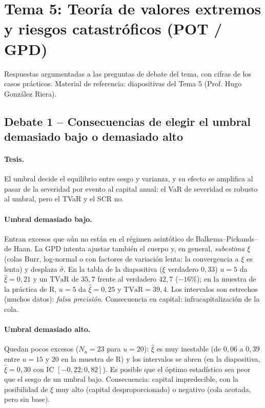 \documentclass[a4paper,12pt]{article}
\newcommand{\TVaR}{\mathrm{TVaR}}
\begin{document}
\restoregeometry
\newpage
{}
\setcounter{page}{1}

\section{Tema 5: Teoría de valores extremos y riesgos catastróficos (POT / GPD)}
\label{sec:tema5debate}
\noindent
Respuestas argumentadas a las preguntas de debate del tema, con cifras de los casos prácticos. Material de referencia: diapositivas del Tema 5 (Prof. Hugo González Riera).

\subsection{Debate 1 -- Consecuencias de elegir el umbral demasiado bajo o demasiado alto}

\paragraph{Tesis.} El umbral decide el equilibrio entre sesgo y varianza, y su efecto se amplifica al pasar de la severidad por evento al capital anual: el VaR de severidad es robusto al umbral, pero el TVaR y el SCR no.

\paragraph{Umbral demasiado bajo.} Entran excesos que a\'un no est\'an en el r\'egimen asint\'otico de Balkema--Pickands--de Haan. La GPD intenta ajustar tambi\'en el cuerpo y, en general, \emph{subestima} $\xi$ (colas Burr, log-normal o con factores de variaci\'on lenta: la convergencia a $\xi$ es lenta) y desplaza $\hat\sigma$. En la tabla de la diapositiva ($\xi$ verdadero $0{,}33$) $u=5$ da $\hat\xi=0{,}21$ y un $\TVaR$ de $35{,}7$ frente al verdadero $42{,}7$ ($-16\%$); en la muestra de la pr\'actica de R, $u=5$ da $\hat\xi=0{,}25$ y $\TVaR=39{,}4$. Los intervalos son estrechos (muchos datos): \emph{falsa precisi\'on}. Consecuencia en capital: infracapitalizaci\'on de la cola.

\paragraph{Umbral demasiado alto.} Quedan pocos excesos ($N_u=23$ para $u=20$): $\hat\xi$ es muy inestable (de $0{,}06$ a $0{,}39$ entre $u=15$ y $20$ en la muestra de R) y los intervalos se abren (en la diapositiva, $\hat\xi=0{,}30$ con IC $[-0{,}22;0{,}82]$). Es posible que el \'optimo estad\'istico sea peor que el sesgo de un umbral bajo. Consecuencia: capital impredecible, con la posibilidad de $\hat\xi$ muy alto (capital desproporcionado) o negativo (cola acotada, pero sin base).
\end{document}
